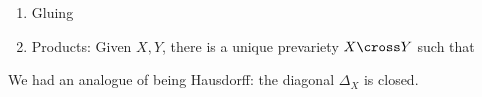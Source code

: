 \begin{enumerate}
\def\labelenumi{\arabic{enumi}.}
\item
  Gluing
\item
  Products: Given \(X, Y\), there is a unique prevariety \(X\cross Y\)
  such that

  \begin{center}
  \end{center}
\end{enumerate}

We had an analogue of being Hausdorff: the diagonal \(\Delta_X\) is
closed.

